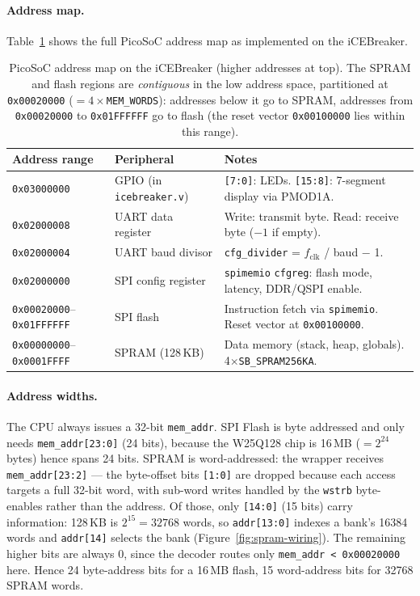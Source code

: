 \documentclass[9pt, a4paper]{extarticle}
\begin{document}
\paragraph{Address map.} Table~\ref{tab:picosoc-addrmap} shows the full PicoSoC address map as implemented on the iCEBreaker.

\begin{table}[htbp]
\centering\small
\renewcommand{\arraystretch}{1.15}
\begin{tabular}{@{}l l l@{}}
    \toprule
    Address range & Peripheral & Notes \\
    \midrule
    \texttt{0x03000000} & GPIO (in \texttt{icebreaker.v}) & \texttt{[7:0]}: LEDs. \texttt{[15:8]}: 7-segment display via PMOD1A. \\
    \texttt{0x02000008} & UART data register & Write: transmit byte. Read: receive byte ($-1$ if empty). \\
    \texttt{0x02000004} & UART baud divisor & \texttt{cfg\_divider} = $f_\text{clk}$ / baud $-$ 1. \\
    \texttt{0x02000000} & SPI config register & \texttt{spimemio} \texttt{cfgreg}: flash mode, latency, DDR/QSPI enable. \\
    \texttt{0x00020000}--\texttt{0x01FFFFFF} & SPI flash & Instruction fetch via \texttt{spimemio}. Reset vector at \texttt{0x00100000}. \\
    \texttt{0x00000000}--\texttt{0x0001FFFF} & SPRAM (128\,KB) & Data memory (stack, heap, globals). 4$\times$\texttt{SB\_SPRAM256KA}. \\
    \bottomrule
\end{tabular}
\caption{PicoSoC address map on the iCEBreaker (higher addresses at top). The SPRAM and flash regions are \emph{contiguous} in the low address space, partitioned at \texttt{0x00020000} ($=4\times$\texttt{MEM\_WORDS}): addresses below it go to SPRAM, addresses from \texttt{0x00020000} to \texttt{0x01FFFFFF} go to flash (the reset vector \texttt{0x00100000} lies within this range).}
\label{tab:picosoc-addrmap}
\end{table}

\paragraph{Address widths.} The CPU always issues a 32-bit \texttt{mem\_addr}. SPI Flash is byte addressed and only needs \texttt{mem\_addr[23:0]} (24 bits), because the W25Q128 chip is 16\,MB ($=2^{24}$ bytes) hence spans 24 bits. SPRAM is word-addressed: the wrapper receives \texttt{mem\_addr[23:2]} --- the byte-offset bits \texttt{[1:0]} are dropped because each access targets a full 32-bit word, with sub-word writes handled by the \texttt{wstrb} byte-enables rather than the address. Of those, only \texttt{[14:0]} (15 bits) carry information: 128\,KB is $2^{15}=32768$ words, so \texttt{addr[13:0]} indexes a bank's 16384 words and \texttt{addr[14]} selects the bank (Figure~\ref{fig:spram-wiring}). The remaining higher bits are always 0, since the decoder routes only \texttt{mem\_addr < 0x00020000} here. Hence 24 byte-address bits for a 16\,MB flash, 15 word-address bits for 32768 SPRAM words.
\end{document}
